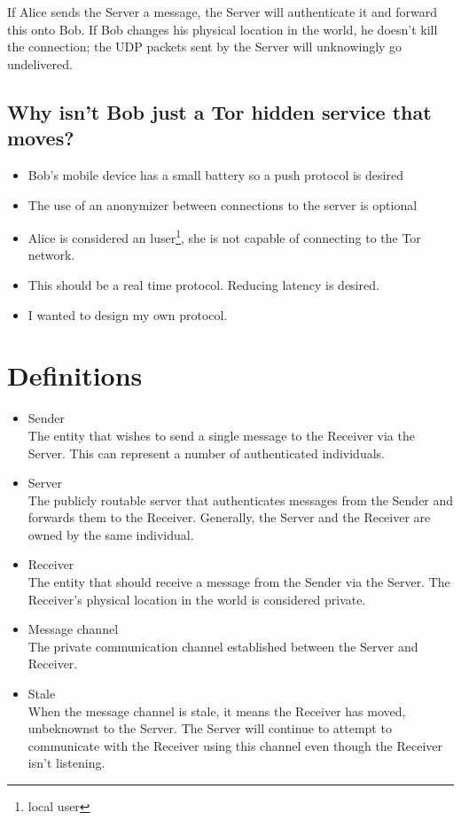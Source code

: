 \documentclass[11pt]{article}
\begin{document}
If Alice sends the Server a message, the Server will authenticate it and
forward this onto Bob. If Bob changes his physical location in the world, he
doesn't kill the connection; the UDP packets sent by the Server will
unknowingly go undelivered.

\subsection*{Why isn't Bob just a Tor hidden service that moves?}
\begin{itemize}
\item Bob's mobile device has a small battery so a push protocol is desired
\item The use of an anonymizer between connections to the server is optional
\item Alice is considered an luser\footnote{local user}, she is not capable
of connecting to the Tor network.
\item This should be a real time protocol. Reducing latency is desired.
\item I wanted to design my own protocol.
\end{itemize}

\pagebreak
\section*{Definitions}
\begin{itemize}
\item Sender \\
The entity that wishes to send a single message to the Receiver via the Server.
This can represent a number of authenticated individuals.
\item Server \\
The publicly routable server that authenticates messages from the Sender and
forwards them to the Receiver. Generally, the Server and the Receiver are
owned by the same individual.
\item Receiver \\
The entity that should receive a message from the Sender via the Server. The
Receiver's physical location in the world is considered private.
\item Message channel \\
The private communication channel established between the Server and Receiver.
\item Stale \\
When the message channel is stale, it means the Receiver has moved, unbeknownst
to the Server. The Server will continue to attempt to communicate with the
Receiver using this channel even though the Receiver isn't listening.
\end{itemize}
\pagebreak
\end{document}
